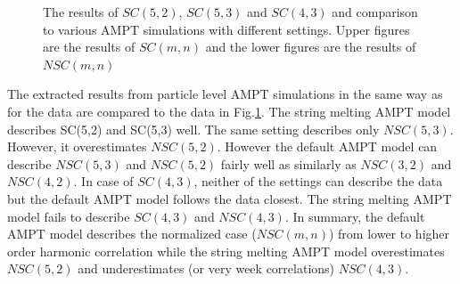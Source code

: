 \begin{figure}[h]
\begin{center}
        \caption{The results of  $SC(5,2)$, $SC(5,3)$ and $SC(4,3)$ and comparison to various AMPT simulations with different settings.  Upper figures are the results of $SC(m,n)$ and the lower figures are the results of $NSC(m,n)$}
        \label{AMPTcomhigh}
        \end{center}   
     \end{figure}
     
     
The extracted results  from particle level AMPT simulations in the same way as for the data are compared to the data in Fig.\ref{AMPTcomhigh}.
The string melting AMPT model describes SC(5,2) and SC(5,3) well. The same setting describes only $NSC(5,3)$. However, it overestimates $NSC(5,2)$. 
However the default AMPT model can describe $NSC(5,3)$ and $NSC(5,2)$ fairly well as similarly as $NSC(3,2)$ and $NSC(4,2)$.
In case of $SC(4,3)$, neither of the settings can describe the data but the default AMPT model follows the data closest. 
The string melting AMPT model fails to describe $SC(4,3)$ and $NSC(4,3)$.
In summary, the default AMPT model describes the normalized case ($NSC(m,n)$) from lower to higher order harmonic correlation while the string melting AMPT model overestimates $NSC(5,2)$ and 
underestimates (or very week correlations) $NSC(4,3)$. 
     

